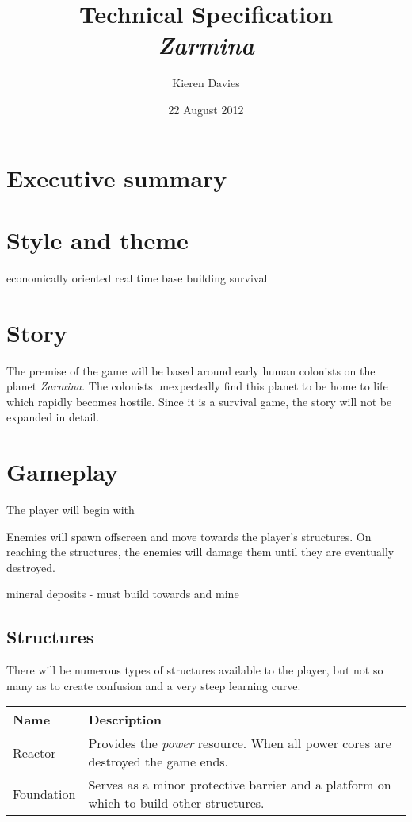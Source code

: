 \documentclass[a4paper,titlepage]{article}
\begin{document}
\title{Technical Specification\\
       \emph{Zarmina}}
\author{Kieren Davies}
\date {22 August 2012}
\maketitle

\section{Executive summary}

\section{Style and theme}
economically oriented
real time
base building
survival

\section{Story}

The premise of the game will be based around early human colonists on the
planet \emph{Zarmina}.  The colonists unexpectedly find this planet to be home to life which rapidly becomes hostile.
Since it is a survival game, the story will not be expanded in detail.

\section{Gameplay}

The player will begin with 

Enemies will spawn offscreen and move towards the player's structures.  On reaching the structures, the enemies will damage them until they are eventually destroyed.

mineral deposits - must build towards and mine

\subsection{Structures}

There will be numerous types of structures available to the player, but not so many as to create confusion and a very steep learning curve.

\begin{tabular}{lp{9cm}}
Name & Description \\ \hline
Reactor & Provides the \emph{power} resource.  When all power cores are destroyed the game ends. \\
Foundation & Serves as a minor protective barrier and a platform on which to build other structures. \\
\end{tabular}
\end{document}
